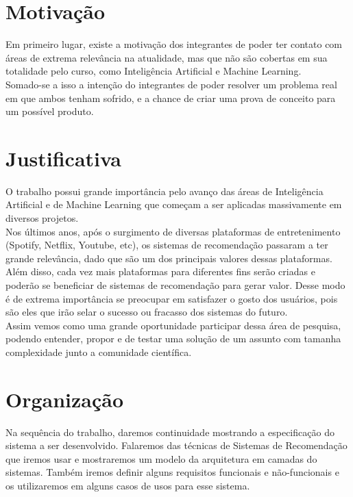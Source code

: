 \documentclass[
	12pt,				%
    oneside,			%
	a4paper,			%
	english,			%
	french,				%
	spanish,			%
	brazil,				%
	]{abntex2}
\begin{document}
\section{Motivação}

Em primeiro lugar, existe a motivação dos integrantes de poder ter contato com áreas de extrema relevância na atualidade, mas que não são cobertas em sua totalidade pelo curso, como Inteligência Artificial e Machine Learning. \\Somado-se a isso a intenção do integrantes de poder resolver um problema real em que ambos tenham sofrido, e a chance de criar uma prova de conceito para um possível produto.


\section{Justificativa}

O trabalho possui grande importância pelo avanço das áreas de Inteligência Artificial e de Machine Learning que começam a ser aplicadas massivamente em diversos projetos.\\
Nos últimos anos, após o  surgimento de diversas plataformas de entretenimento (Spotify, Netflix, Youtube, etc), os sistemas de recomendação passaram a ter grande relevância, dado que são um dos principais valores dessas plataformas.\\
Além disso, cada vez mais plataformas para diferentes fins serão criadas e poderão se beneficiar de sistemas de recomendação para gerar valor.
Desse modo é de extrema importância se preocupar em satisfazer o gosto dos usuários, pois são eles que irão selar o sucesso ou fracasso dos sistemas do futuro.\\
Assim vemos como uma grande oportunidade participar dessa área de pesquisa, podendo entender, propor e de testar uma solução de um assunto com tamanha complexidade junto a comunidade científica.


\section{Organização}
Na sequência do trabalho, daremos continuidade mostrando a especificação do sistema a ser desenvolvido. Falaremos das técnicas de Sistemas de Recomendação que iremos usar e mostraremos um modelo da arquitetura em camadas do sistemas.
Também iremos definir alguns requisitos funcionais e não-funcionais e os utilizaremos em alguns casos de usos para esse sistema.


\end{document}
